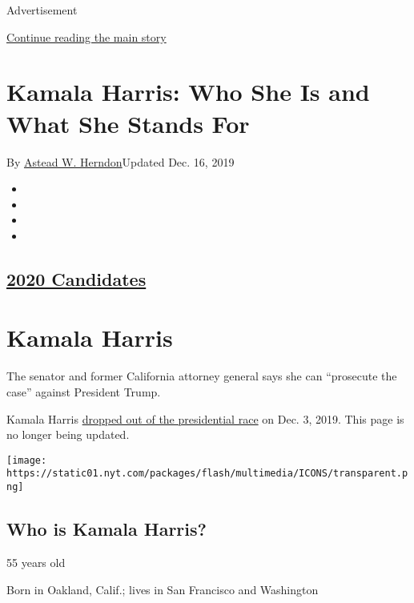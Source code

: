 Advertisement

\protect\hyperlink{after-top}{Continue reading the main story}

\hypertarget{kamala-harris-who-she-is-and-what-she-stands-for}{%
\section{Kamala Harris: Who She Is and What She Stands
For}\label{kamala-harris-who-she-is-and-what-she-stands-for}}

By \href{https://www.nytimes.com/by/astead-w-herndon}{Astead W.
Herndon}Updated Dec. 16, 2019

\begin{itemize}
\item
\item
\item
\item
\end{itemize}

\hypertarget{2020-candidates}{%
\subsection{\texorpdfstring{\href{https://www.nytimes.com/interactive/2019/us/politics/2020-presidential-candidates.html}{2020
Candidates}}{2020 Candidates}}\label{2020-candidates}}

\hypertarget{kamala-harris}{%
\section{Kamala Harris}\label{kamala-harris}}

The senator and former California attorney general says she can
``prosecute the case'' against President Trump.

Kamala Harris
\href{https://www.nytimes.com/2019/12/03/us/politics/kamala-harris-campaign-drops-out.html}{dropped
out of the presidential race} on Dec. 3, 2019. This page is no longer
being updated.

\texttt{[image: https://static01.nyt.com/packages/flash/multimedia/ICONS/transparent.png]}

\hypertarget{who-is-kamala-harris}{%
\subsection{Who is Kamala Harris?}\label{who-is-kamala-harris}}

55 years old

Born in Oakland, Calif.; lives in San Francisco and Washington

